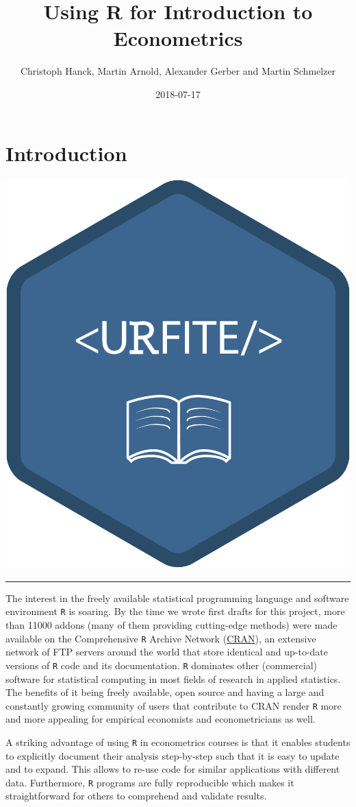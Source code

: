 \documentclass[]{book}
\title{Using R for Introduction to Econometrics}
\author{Christoph Hanck, Martin Arnold, Alexander Gerber and Martin Schmelzer}
\date{2018-07-17}
\theoremstyle{definition}
\theoremstyle{definition}
\theoremstyle{definition}
\theoremstyle{remark}
\begin{document}
\maketitle

{
\setcounter{tocdepth}{1}
\tableofcontents
}
\chapter{Introduction}\label{introduction}

\begin{center}\includegraphics[width=0.45\linewidth]{images/URFITE_logo} \end{center}

\noindent\rule{\textwidth}{1pt}

The interest in the freely available statistical programming language
and software environment \texttt{R} is soaring. By the time we wrote
first drafts for this project, more than 11000 addons (many of them
providing cutting-edge methods) were made available on the Comprehensive
\texttt{R} Archive Network (\href{https://cran.r-project.org/}{CRAN}),
an extensive network of FTP servers around the world that store
identical and up-to-date versions of \texttt{R} code and its
documentation. \texttt{R} dominates other (commercial) software for
statistical computing in most fields of research in applied statistics.
The benefits of it being freely available, open source and having a
large and constantly growing community of users that contribute to CRAN
render \texttt{R} more and more appealing for empirical economists and
econometricians as well.

A striking advantage of using \texttt{R} in econometrics courses is that
it enables students to explicitly document their analysis step-by-step
such that it is easy to update and to expand. This allows to re-use code
for similar applications with different data. Furthermore, \texttt{R}
programs are fully reproducible which makes it straightforward for
others to comprehend and validate results.
\end{document}
